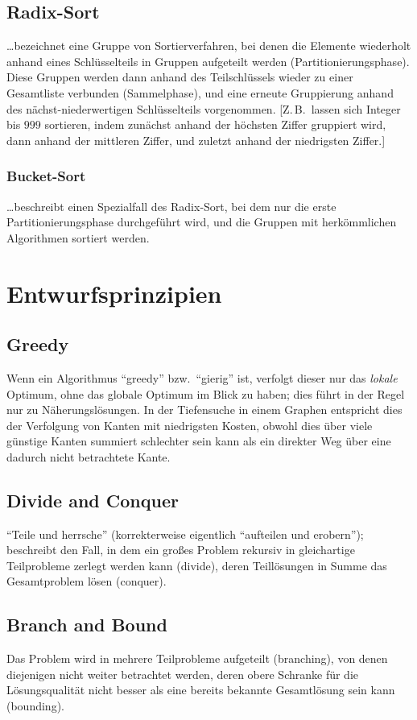 \section{Radix-Sort}
\ldots bezeichnet eine Gruppe von Sortierverfahren, bei denen die Elemente wiederholt anhand eines Schlüsselteils in Gruppen aufgeteilt werden (Partitionierungsphase).
Diese Gruppen werden dann anhand des Teilschlüssels wieder zu einer Gesamtliste verbunden (Sammelphase), und eine erneute Gruppierung anhand des nächst-niederwertigen Schlüsselteils vorgenommen.
[Z.\,B.~lassen sich Integer bis $999$ sortieren, indem zunächst anhand der höchsten Ziffer gruppiert wird, dann anhand der mittleren Ziffer, und zuletzt anhand der niedrigsten Ziffer.]

\subsection{Bucket-Sort}
\ldots beschreibt einen Spezialfall des Radix-Sort, bei dem nur die erste Partitionierungsphase durchgeführt wird, und die Gruppen mit herkömmlichen Algorithmen sortiert werden.

\chapter{Entwurfsprinzipien}
\section{Greedy}
Wenn ein Algorithmus \enquote{greedy} bzw.~\enquote{gierig} ist, verfolgt dieser nur das \emph{lokale} Optimum, ohne das globale Optimum im Blick zu haben; dies führt in der Regel nur zu Näherungslösungen.
In der Tiefensuche in einem Graphen entspricht dies der Verfolgung von Kanten mit niedrigsten Kosten, obwohl dies über viele günstige Kanten summiert schlechter sein kann als ein direkter Weg über eine dadurch nicht betrachtete Kante.

\section{Divide and Conquer}
\enquote{Teile und herrsche} (korrekterweise eigentlich \enquote{aufteilen und erobern}); beschreibt den Fall, in dem ein großes Problem rekursiv in gleichartige Teilprobleme zerlegt werden kann (divide), deren Teillösungen in Summe das Gesamtproblem lösen (conquer).

\section{\label{sec:branch-and-bound}Branch and Bound}
Das Problem wird in mehrere Teilprobleme aufgeteilt (branching), von denen diejenigen nicht weiter betrachtet werden, deren obere Schranke für die Lösungsqualität nicht besser als eine bereits bekannte Gesamtlösung sein kann (bounding).
